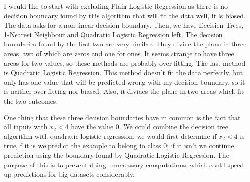 \documentclass{article}
\begin{document}
I would like to start with excluding Plain Logistic Regression as there is no decision boundary found by this algorithm that will fit the data well, it is biased. The data asks for a non-linear decision boundary. Then, we have Decision Trees, 1-Nearest Neighbour and Quadratic Logistic Regression left. The decision boundaries found by the first two are very similar. They divide the plane in three areas, two of which are zeros and one for ones. It seems strange to have three areas for two values, so these methods are probably over-fitting. The last method is Quadratic Logistic Regression. This method doesn't fit the data perfectly, but only has one value that will be predicted wrong with my decision boundary, so it is neither over-fitting nor biased. Also, it divides the plane in two areas which fit the two outcomes. 

One thing that these three decision boundaries have in common is the fact that all inputs with $x_2 < 4$ have the value 0. We could combine the decision tree algorithm with quadratic logistic regression. we would first determine if $x_2 < 4$ is true, f it is we predict the example to belong to class 0; if it isn't we continue prediction using the boundary found by Quadratic Logistic Regression. The purpose of this is to prevent doing unnecessary computations, which could speed up predictions for big datasets considerably.
\end{document}
